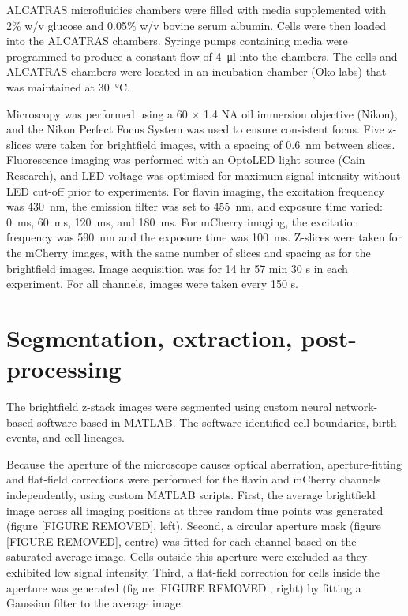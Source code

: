 ALCATRAS microfluidics \citep{craneMicrofluidicSystemStudying2014}  chambers were filled with media supplemented with 2\% w/v glucose and 0.05\% w/v bovine serum albumin.
Cells were then loaded into the ALCATRAS chambers.
Syringe pumps containing media were programmed to produce a constant flow of \SI{4}{\micro\litre} into the chambers.
The cells and ALCATRAS chambers were located in an incubation chamber (Oko-labs) that was maintained at \SI{30}{\celsius}.

Microscopy was performed using a 60 $\times$ 1.4 NA oil immersion objective (Nikon), and the Nikon Perfect Focus System was used to ensure consistent focus.
Five z-slices were taken for brightfield images, with a spacing of \SI{0.6}{\nano\metre} between slices.
Fluorescence imaging was performed with an OptoLED light source (Cain Research), and LED voltage was optimised for maximum signal intensity without LED cut-off prior to experiments.
For flavin imaging, the excitation frequency was \SI{430}{\nano\metre}, the emission filter was set to \SI{455}{\nano\metre}, and exposure time varied: \SI{0}{\milli\second}, \SI{60}{\milli\second}, \SI{120}{\milli\second}, and \SI{180}{\milli\second}.
For mCherry imaging, the excitation frequency was \SI{590}{\nano\metre} and the exposure time was \SI{100}{\milli\second}.
Z-slices were taken for the mCherry images, with the same number of slices and spacing as for the brightfield images.
Image acquisition was for 14 hr 57 min 30 s in each experiment.
For all channels, images were taken every 150 s.

\section{Segmentation, extraction, post-processing}
\label{sec:methods-segmentation}


The brightfield z-stack images were segmented using custom neural network-based software based in MATLAB.
The software identified cell boundaries, birth events, and cell lineages.

Because the aperture of the microscope causes optical aberration, aperture-fitting and flat-field corrections were performed for the flavin and mCherry channels independently, using custom MATLAB scripts.
First, the average brightfield image across all imaging positions at three random time points was generated (figure [FIGURE REMOVED], left).
Second, a circular aperture mask (figure [FIGURE REMOVED], centre) was fitted for each channel based on the saturated average image.
Cells outside this aperture were excluded as they exhibited low signal intensity.
Third, a flat-field correction for cells inside the aperture was generated (figure [FIGURE REMOVED], right) by fitting a Gaussian filter to the average image.

